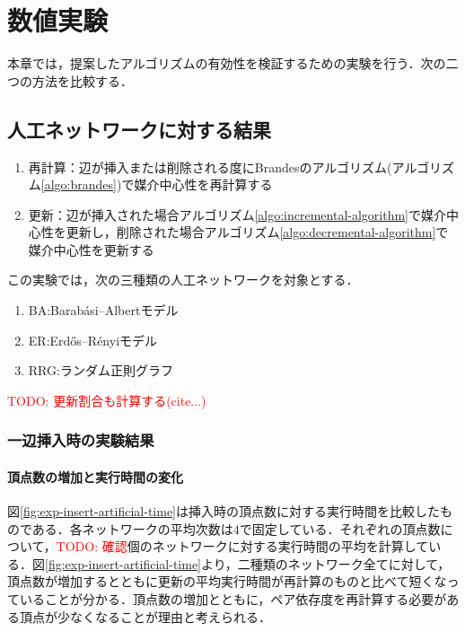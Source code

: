 \chapter{数値実験}

本章では，提案したアルゴリズムの有効性を検証するための実験を行う．次の二つの方法を比較する．

\section{人工ネットワークに対する結果}

\begin{enumerate}
\item 再計算：辺が挿入または削除される度にBrandesのアルゴリズム(アルゴリズム\ref{algo:brandes})で媒介中心性を再計算する
\item 更新：辺が挿入された場合アルゴリズム\ref{algo:incremental-algorithm}で媒介中心性を更新し，削除された場合アルゴリズム\ref{algo:decremental-algorithm}で媒介中心性を更新する
\end{enumerate}

この実験では，次の三種類の人工ネットワークを対象とする．
\begin{enumerate}
\item BA:Barab\'{a}si--Albertモデル
\item ER:Erd\H{o}s--R\'{e}nyiモデル
\item RRG:ランダム正則グラフ
\end{enumerate}

\textcolor{red}{TODO: 更新割合も計算する(cite...)}

\subsection{一辺挿入時の実験結果}

\subsubsection{頂点数の増加と実行時間の変化}
図\ref{fig:exp-insert-artificial-time}は挿入時の頂点数に対する実行時間を比較したものである．各ネットワークの平均次数は$4$で固定している．それぞれの頂点数について，\textcolor{red}{TODO: 確認}個のネットワークに対する実行時間の平均を計算している．図\ref{fig:exp-insert-artificial-time}より，二種類のネットワーク全てに対して，頂点数が増加するとともに更新の平均実行時間が再計算のものと比べて短くなっていることが分かる．頂点数の増加とともに，ペア依存度を再計算する必要がある頂点が少なくなることが理由と考えられる．

